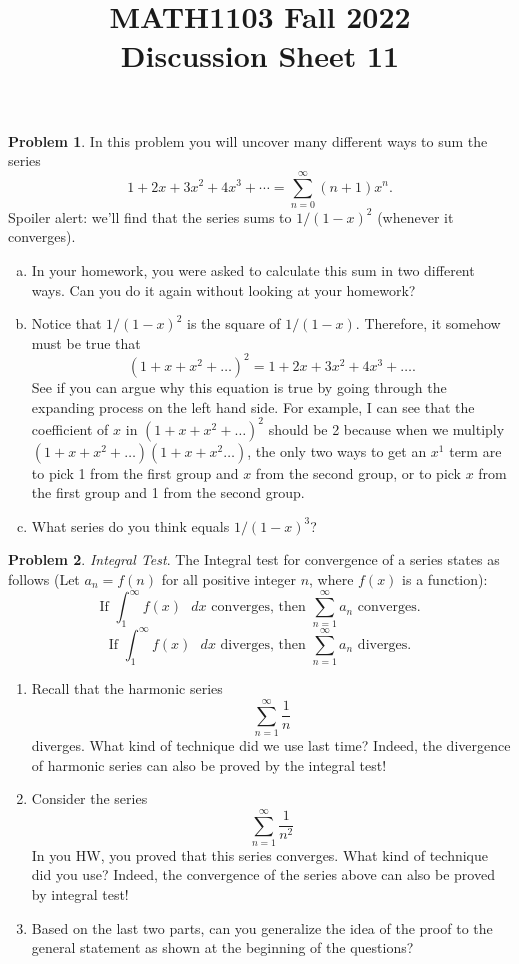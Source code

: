 \documentclass[11pt,oneside]{amsart}
\title{MATH1103 Fall 2022\\
Discussion Sheet 11}
\theoremstyle{definition}
\newtheorem{problem}{Problem}
\begin{document}
    \maketitle
 
    \begin{problem} In this problem you will uncover many different ways to sum the series
        \[1+2x+3x^2+4x^3+\cdots=\sum_{n=0}^\infty (n+1)x^n.\]
        Spoiler alert: we'll find that the series sums to $1/(1-x)^2$ (whenever it converges).
        \begin{enumerate}[(a)]
            \item In your homework, you were asked to calculate this sum in two different ways. Can you do it again without looking at your homework?
            \vfill
            \item Notice that $1/(1-x)^2$ is the square of $1/(1-x)$. Therefore, it somehow must be true that
            \[(1+x+x^2+\dots)^2=1+2x+3x^2+4x^3+\dots.\]
            See if you can argue why this equation is true by going through the expanding process on the left hand side. For example, I can see that the coefficient of $x$ in $(1+x+x^2+\dots)^2$ should be 2 because when we multiply $(1+x+x^2+\dots)(1+x+x^2\dots)$, the only two ways to get an $x^1$ term are to pick 1 from the first group and $x$ from the second group, or to pick $x$ from the first group and 1 from the second group.
            \vfill
            \item What series do you think equals $1/(1-x)^3$?
            \vfill
        \end{enumerate}
    \end{problem}
    \newpage
    \begin{problem}\textit{Integral Test}.
    The Integral test for convergence of a series states as follows (Let $a_n=f(n)$ for all positive integer $n$, where $f(x)$ is a function):
    $$
    \text{If }\int_1^\infty f(x) \text{ }dx \text{ converges, then }\sum_{n=1}^\infty a_n \text{ converges}.
    $$
    $$
    \text{If }\int_1^\infty f(x) \text{ }dx \text{ diverges, then }\sum_{n=1}^\infty a_n \text{ diverges}.
    $$
    \begin{enumerate}
        \item Recall that the harmonic series
        $$
        \sum_{n=1}^\infty \frac{1}{n}
        $$
        diverges. What kind of technique did we use last time? Indeed, the divergence of harmonic series can also be proved by the integral test!
        \vfill
        \item Consider the series
        $$
        \sum_{n=1}^\infty \frac{1}{n^2}
        $$
        In you HW, you proved that this series converges. What kind of technique did you use? Indeed, the convergence of the series above can also be proved by integral test!
        \vfill
        \item Based on the last two parts, can you generalize the idea of the proof to the general statement as shown at the beginning of the questions?
        \vfill
    \end{enumerate}
    \end{problem}
\end{document}
